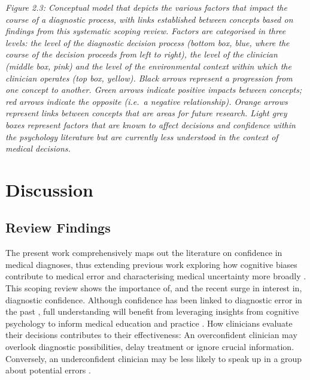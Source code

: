 \documentclass[a4paper, nobind]{templates/ociamthesis}
\begin{document}
\emph{Figure 2.3: Conceptual model that depicts the various factors that impact the course of a diagnostic process, with links established between concepts based on findings from this systematic scoping review. Factors are categorised in three levels: the level of the diagnostic decision process (bottom box, blue, where the course of the decision proceeds from left to right), the level of the clinician (middle box, pink) and the level of the environmental context within which the clinician operates (top box, yellow). Black arrows represent a progression from one concept to another. Green arrows indicate positive impacts between concepts; red arrows indicate the opposite (i.e.~a negative relationship). Orange arrows represent links between concepts that are areas for future research. Light grey boxes represent factors that are known to affect decisions and confidence within the psychology literature but are currently less understood in the context of medical decisions.}

\section*{Discussion}\label{discussion}

\subsection*{Review Findings}\label{review-findings}

The present work comprehensively maps out the literature on confidence in medical diagnoses, thus extending previous work exploring how cognitive biases contribute to medical error \autocite{kostopoulou_diagnostic_2008,graber_cognitive_2012,saposnik_cognitive_2016} and characterising medical uncertainty more broadly \autocite{hall_reviewing_2002,bhise_defining_2018}. This scoping review shows the importance of, and the recent surge in interest in, diagnostic confidence. Although confidence has been linked to diagnostic error in the past \autocite{berner_overconfidence_2008}, full understanding will benefit from leveraging insights from cognitive psychology to inform medical education and practice \autocite{wears_diagnosing_2014}. How clinicians evaluate their decisions contributes to their effectiveness: An overconfident clinician may overlook diagnostic possibilities, delay treatment or ignore crucial information. Conversely, an underconfident clinician may be less likely to speak up in a group about potential errors \autocite{hemon_speaking_2020}.
\end{document}
